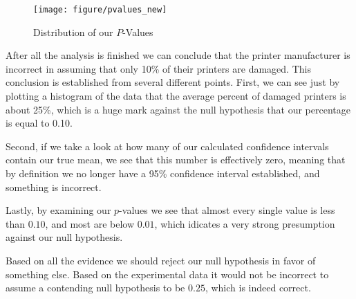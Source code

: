 \documentclass[10pt]{report}\usepackage[]{graphicx}\usepackage[]{xcolor}
\makeatletter
\def\maxwidth{ %
  \ifdim\Gin@nat@width>\linewidth
    \linewidth
  \else
    \Gin@nat@width
  \fi
}
\newenvironment{knitrout}{}{} %
\makeatother
\begin{document}
\begin{easylist}[enumerate]
\begin{knitrout}
\begin{figure}[H]
{\centering \texttt{[image: figure/pvalues\_new]} 

}

\caption[Distribution of our $P$-Values]{Distribution of our $P$-Values\label{fig:pvalues_new} }
\end{figure}


\end{knitrout}


        After all the analysis is finished we can conclude that the printer manufacturer is incorrect in assuming that
        only 10\% of their printers are damaged. This conclusion is established from several different points. First, we
        can see just by plotting a histogram of the data that the average percent of damaged printers is about 25\%,
        which is a huge mark against the null hypothesis that our percentage is equal to 0.10.\newline

        Second, if we take a look at how many of our calculated confidence intervals contain our true mean, we see that
        this number is effectively zero, meaning that by definition we no longer have a 95\% confidence interval
        established, and something is incorrect.\newline

        Lastly, by examining our $p$-values we see that almost every single value is less than $0.10$, and most are
        below $0.01$, which idicates a very strong presumption against our null hypothesis.\newline

        Based on all the evidence we should reject our null hypothesis in favor of something else. Based on the
        experimental data it would not be incorrect to assume a contending null hypothesis to be $0.25$, which is indeed
        correct.

    \end{easylist}
\end{document}
